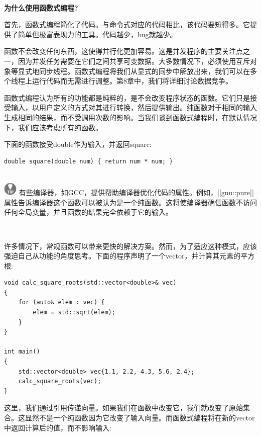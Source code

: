 \noindent\textbf{}\ \par
\textbf{为什么使用函数式编程?} \ \par
首先，函数式编程简化了代码。与命令式对应的代码相比，该代码要短得多。它提供了简单但极富表现力的工具。代码越少，bug就越少。 \par
函数不会改变任何东西，这使得并行化更加容易。这是并发程序的主要关注点之一，因为并发任务需要在它们之间共享可变数据。大多数情况下，必须使用互斥对象等显式地同步线程。函数式编程将我们从显式的同步中解放出来，我们可以在多个线程上运行代码而无需进行调整。第8章中，我们将详细讨论数据竞争。 \par
函数式编程认为所有的功能都是纯粹的，是不会改变程序状态的函数。它们只是接受输入，以用户定义的方式对其进行转换，然后提供输出。纯函数对于相同的输入生成相同的结果，而不受调用次数的影响。当我们谈到函数式编程时，在默认情况下，我们应该考虑所有纯函数。 \par
下面的函数接受double作为输入，并返回square: \par

\begin{lstlisting}[caption={}]
double square(double num) { return num * num; }
\end{lstlisting}

\hspace*{\fill} \\ %
\includegraphics[width=0.05\textwidth]{images/tip}
有些编译器，如GCC，提供帮助编译器优化代码的属性。例如，[[gnu::pure]]属性告诉编译器这个函数可以被认为是一个纯函数。这将使编译器确信函数不访问任何全局变量，并且函数的结果完全依赖于它的输入。 \par
\noindent\textbf{}\ \par

许多情况下，常规函数可以带来更快的解决方案。然而，为了适应这种模式，应该强迫自己从功能的角度思考。下面的程序声明了一个vector，并计算其元素的平方根: \par

\begin{lstlisting}[caption={}]
void calc_square_roots(std::vector<double>& vec)
{
	for (auto& elem : vec) {
		elem = std::sqrt(elem);
	}
}

int main()
{
	std::vector<double> vec{1.1, 2.2, 4.3, 5.6, 2.4};
	calc_square_roots(vec);
}
\end{lstlisting}

这里，我们通过引用传递向量。如果我们在函数中改变它，我们就改变了原始集合。这显然不是一个纯函数因为它改变了输入向量。而函数式编程将在新的vector中返回计算后的值，而不影响输入: \par

